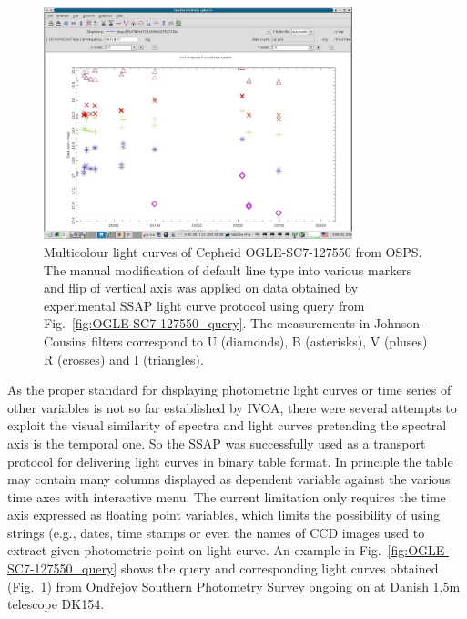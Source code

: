 \documentclass[final,authoryear,5p,times,twocolumn]{elsarticle}
\begin{document}
\begin{figure}[t]
\begin{center}
\includegraphics[width=0.8\textwidth]{OGLE-SC7-127550_plot.pdf}
\caption{Multicolour light curves of Cepheid OGLE-SC7-127550 from
  OSPS. The manual modification of default line type into various
  markers and flip of vertical axis was applied on data obtained by
  experimental SSAP light curve protocol using query from
  Fig.~\ref{fig:OGLE-SC7-127550_query}. The measurements in
  Johnson-Cousins filters correspond to U (diamonds), B (asterisks),
  V (pluses) R (crosses) and I (triangles).  }
\label{fig:OGLE-SC7-127550_plot}
\end{center}
\end{figure}

As the proper standard for displaying photometric light curves or time series
of other variables is not so far established by IVOA, there were several
attempts to exploit the visual similarity of spectra and light curves
pretending the spectral axis is the temporal one.  So the SSAP was
successfully used as a transport protocol for delivering light curves in
binary table format. In principle the table may contain many columns displayed
as dependent variable against the various time axes with interactive menu.
The current limitation only requires the time axis expressed as floating point
variables, which limits the possibility of using strings (e.g., dates, time
stamps or even the names of CCD images used to extract given photometric point
on light curve.  An example in Fig.~\ref{fig:OGLE-SC7-127550_query} shows the
query and corresponding light curves obtained  (Fig.~\ref{fig:OGLE-SC7-127550_plot})  from
Ond\v{r}ejov Southern Photometry Survey \citep{skoda_adassxxiii} ongoing on
at Danish 1.5m telescope DK154.
\end{document}
